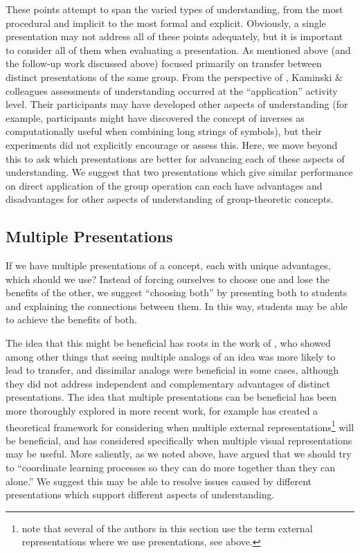 \documentclass[man,10pt]{apa6}
\begin{document}
These points attempt to span the varied types of understanding, from the most procedural and implicit to the most formal and explicit. Obviously, a single presentation may not address all of these points adequately, but it is important to consider all of them when evaluating a presentation. As mentioned above  (and the follow-up work discussed above) focused primarily on transfer between distinct presentations of the same group. From the perspective of , Kaminski \& colleagues assessments of understanding occurred at the ``application'' activity level. Their participants may have developed other aspects of understanding (for example, participants might have discovered the concept of inverses as computationally useful when combining long strings of symbols), but their experiments did not explicitly encourage or assess this. Here, we move beyond this to ask which presentations are better for advancing each of these aspects of understanding. We suggest that two presentations which give similar performance on direct application of the group operation can each have advantages and disadvantages for other aspects of understanding of group-theoretic concepts.\par
\subsection{Multiple Presentations}
If we have multiple presentations of a concept, each with unique advantages, which should we use? Instead of forcing ourselves to choose one and lose the benefits of the other, we suggest ``choosing both'' \cite{Schwartz2015} by presenting both to students and explaining the connections between them. In this way, students may be able to achieve the benefits of both.\par
The idea that this might be beneficial has roots in the work of , who showed among other things that seeing multiple analogs of an idea was more likely to lead to transfer, and dissimilar analogs were beneficial in some cases, although they did not address independent and complementary advantages of distinct presentations. The idea that multiple presentations can be beneficial has been more thoroughly explored in more recent work, for example  has created a theoretical framework for considering when multiple external representations\footnote{note that several of the authors in this section use the term external representations where we use presentations, see above.} will be beneficial, and  has considered specifically when multiple visual representations may be useful. More saliently, as we noted above,  have argued that we should try to ``coordinate learning processes so they can do more together than they can alone.'' We suggest this may be able to resolve issues caused by different presentations which support different aspects of understanding. 
\end{document}
